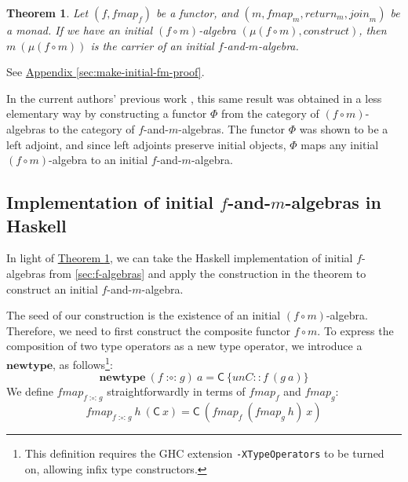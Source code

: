 \documentclass{jfp1}
\newtheorem{theorem}{Theorem}
\newcommand{\thmref}[1]{\hyperref[#1]{Theorem \ref*{#1}}}
\newcommand{\appendixref}[1]{\hyperref[#1]{Appendix \ref*{#1}}}
\newcommand{\kw}[1]{\textbf{#1}}
\begin{document}
\begin{theorem}\label{thm:make-initial-f-and-m-alg}
  Let $(f, \mathit{fmap}_f)$ be a functor, and $(m, \mathit{fmap}_m,
  \mathit{return}_m, \mathit{join}_m)$ be a monad.  If we have an
  initial $(f \circ m)$-algebra $(\mu(f \circ m),
  \mathit{construct})$, then $m~(\mu(f \circ m))$ is the carrier of an
  initial $f$-and-$m$-algebra.
\end{theorem}

\begin{proof*}
  See \appendixref{sec:make-initial-fm-proof}.
\end{proof*}

In the current authors' previous work \cite{atkey12fibrational}, this
same result was obtained in a less elementary way by constructing a
functor $\Phi$ from the category of $(f \circ m)$-algebras to the
category of $f$-and-$m$-algebras. The functor $\Phi$ was shown to be a
left adjoint, and since left adjoints preserve initial objects, $\Phi$
maps any initial $(f \circ m)$-algebra to an initial
$f$-and-$m$-algebra.


\subsection{Implementation of initial \texorpdfstring{$f$}{f}-and-\texorpdfstring{$m$}{m}-algebras in Haskell}
\label{sec:f-and-m-alg-impl}

\newcommand{\fcompose}{\mathop{\mathord:\circ\mathord:}}

In light of \thmref{thm:make-initial-f-and-m-alg}, we can take the
Haskell implementation of initial $f$-algebras from
\autoref{sec:f-algebras} and apply the construction in the
theorem to construct an initial $f$-and-$m$-algebra.

The seed of our construction is the existence of an initial $(f \circ
m)$-algebra. Therefore, we need to first construct the composite
functor $f \circ m$. To express the composition of two type operators
as a new type operator, we introduce a $\kw{newtype}$, as
follows\footnote{This definition requires the GHC extension
  \texttt{-XTypeOperators} to be turned on, allowing infix type
  constructors.}:
\begin{displaymath}
  \kw{newtype}~(f \fcompose g)~a = \mathsf{C}~\{\mathit{unC} :: f~(g~a) \}
\end{displaymath}
We define $\mathit{fmap}_{f\fcompose g}$ straightforwardly in terms of
$\mathit{fmap}_f$ and $\mathit{fmap}_g$:
\begin{displaymath}
  \mathit{fmap}_{f\fcompose g}~h~(\mathsf{C}~x) = \mathsf{C}~(\mathit{fmap}_f~(\mathit{fmap}_g~h)~x)
\end{displaymath}
\end{document}

